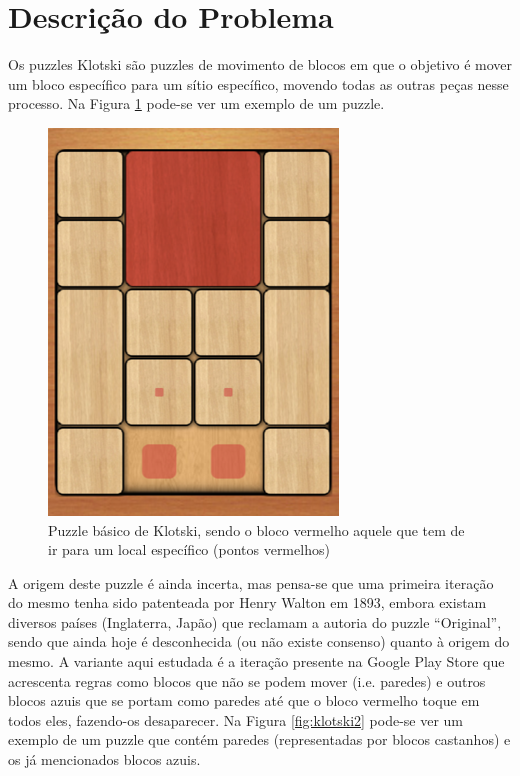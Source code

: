 \documentclass[conference]{IEEEtran}
\begin{document}
\section{Descrição do Problema}
Os puzzles Klotski são puzzles de movimento de blocos em que o objetivo é mover um bloco específico para um sítio específico, movendo todas as outras peças nesse processo. Na Figura \ref{fig:klotski1} pode-se ver um exemplo de um puzzle.

\begin{figure}
	\centering
	\includegraphics[width=0.75\linewidth]{klotski1.png}
	\caption{Puzzle básico de Klotski, sendo o bloco vermelho aquele que tem de ir para um local específico (pontos vermelhos)}
	\label{fig:klotski1}
\end{figure}

A origem deste puzzle é ainda incerta, mas pensa-se que uma primeira iteração do mesmo tenha sido patenteada por Henry Walton em 1893, embora existam diversos países (Inglaterra, Japão) que reclamam a autoria do puzzle “Original”, sendo que ainda hoje é desconhecida (ou não existe consenso) quanto à origem do mesmo. \cite{b2}
A variante aqui estudada é a iteração presente na Google Play Store \cite{b1} que acrescenta regras como blocos que não se podem mover (i.e. paredes) e outros blocos azuis que se portam como paredes até que o bloco vermelho toque em todos eles, fazendo-os desaparecer. Na Figura \ref{fig:klotski2} pode-se ver um exemplo de um puzzle que contém paredes (representadas por blocos castanhos) e os já mencionados blocos azuis.
\end{document}
